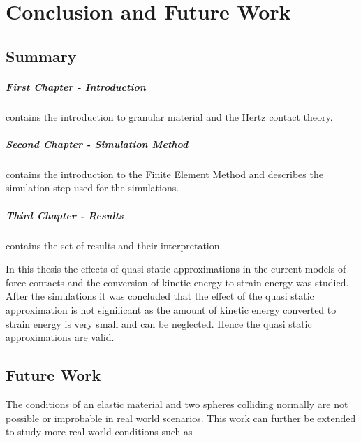 %
% 


\chapter{Conclusion and Future Work}
\label{sec:conclusion_and_future_work}

\section{Summary}

\paragraph{First Chapter - Introduction} contains the introduction to granular material and the Hertz contact theory.

\paragraph{Second Chapter - Simulation Method} contains the introduction to the Finite Element Method and describes the simulation step used for the simulations.

\paragraph{Third Chapter - Results} contains the set of results and their interpretation.  

In this thesis the effects of quasi static approximations in the current models of force contacts and the conversion of kinetic energy to strain energy was studied. After the simulations it was concluded that the effect of the quasi static approximation is not significant as the amount of kinetic energy converted to strain energy is very small and can be neglected. Hence the quasi static approximations are valid.


\section{Future Work}

The conditions of an elastic material and two spheres colliding normally are not possible or improbable in real world scenarios. This work can further be extended to study more real world conditions such as

